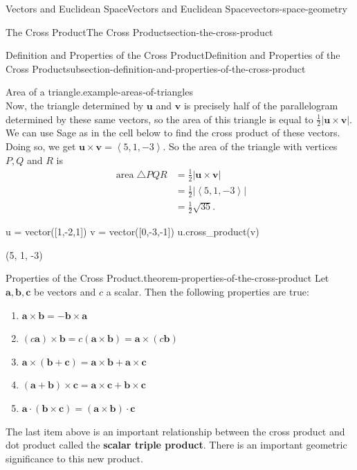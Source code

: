 \documentclass[oneside,10pt,]{book}
\newcommand{\terminology}[1]{\textbf{#1}}
\numberwithin{equation}{section}
\newcommand{\vv}[1]{\mathbf{#1}}
\newcommand{\dotprod}[1]{\left\langle #1 \right\rangle}
\begin{document}
\begin{chapterptx}{Vectors and Euclidean Space}{}{Vectors and Euclidean Space}{}{}{vectors-space-geometry}
\begin{sectionptx}{The Cross Product}{}{The Cross Product}{}{}{section-the-cross-product}
\begin{subsectionptx}{Definition and Properties of the Cross Product}{}{Definition and Properties of the Cross Product}{}{}{subsection-definition-and-properties-of-the-cross-product}
\begin{example}{Area of a triangle.}{example-areas-of-triangles}
\begin{equation*}
\end{equation*}
\hypertarget{p-1183}{}%
Now, the triangle determined by \(\vv{u}\) and \(\vv{v}\) is precisely half of the parallelogram determined by these same vectors, so the area of this triangle is equal to \(\frac{1}{2}|\vv{u}\times\vv{v}|\). We can use Sage as in the cell below to find the cross product of these vectors. Doing so, we get \(\vv{u}\times\vv{v} = \dotprod{5,1,-3}.\) So the area of the triangle with vertices \(P,Q\) and \(R\) is%
%
\begin{align*}
\operatorname{area} \triangle PQR & = \frac{1}{2}|\vv{u}\times\vv{v}| \\
& = \frac{1}{2}|\dotprod{5,1,-3}| \\
& = \frac{1}{2}\sqrt{35}. 
\end{align*}
\end{example}
\begin{sageinput}
u = vector([1,-2,1])
v = vector([0,-3,-1])
u.cross_product(v)
\end{sageinput}
\begin{sageoutput}
(5, 1, -3)
\end{sageoutput}
\begin{theorem}{Properties of the Cross Product.}{}{theorem-properties-of-the-cross-product}%
\hypertarget{p-1184}{}%
Let \(\vv{a},\vv{b},\vv{c}\) be vectors and \(c\) a scalar. Then the following properties are true:%
\leavevmode%
\begin{multicols}{2}
\begin{enumerate}
\item\hypertarget{li-123}{}\(\vv{a}\times\vv{b} = -\vv{b}\times\vv{a}\)%
\item\hypertarget{li-124}{}\((c\vv{a})\times\vv{b} = c(\vv{a}\times\vv{b}) = \vv{a}\times(c\vv{b})\)%
\item\hypertarget{li-125}{}\(\vv{a}\times(\vv{b}+\vv{c}) = \vv{a}\times\vv{b}+\vv{a}\times\vv{c}\)%
\item\hypertarget{li-126}{}\((\vv{a}+\vv{b})\times\vv{c} = \vv{a}\times\vv{c}+\vv{b}\times\vv{c}\)%
\item\hypertarget{li-127}{}\(\vv{a}\cdot(\vv{b}\times\vv{c}) = (\vv{a}\times\vv{b})\cdot\vv{c}\)%
\end{enumerate}
\end{multicols}
\end{theorem}
\hypertarget{p-1185}{}%
The last item above is an important relationship between the cross product and dot product called the \terminology{scalar triple product}. There is an important geometric significance to this new product.%

\end{subsectionptx}
\end{sectionptx}
\end{chapterptx}
\end{document}
